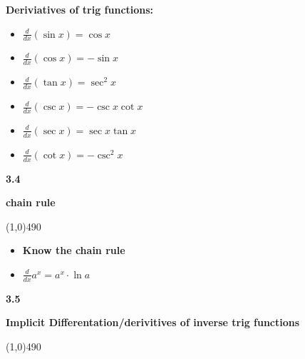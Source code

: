 \documentclass{report}
\begin{document}
    \bigbreak \noindent 
    \begin{mdframed}
        \textbf{Deriviatives of trig functions:}
          \begin{itemize}
            \item $ \frac{d}{dx}( \sin{x}) = \cos{x}$
            \item $ \frac{d}{dx}( \cos{x}) = - \sin{x}$
            \item $ \frac{d}{dx}( \tan{x}) = \sec^2{x}$
            \item $ \frac{d}{dx}( \csc{x}) =-\csc{x}\cot{x}$
            \item $ \frac{d}{dx}( \sec{x}) =\sec{x}\tan{x}$
            \item $ \frac{d}{dx}( \cot{x}) =-\csc^2{x}$
          \end{itemize}
    \end{mdframed}

    \bigbreak \noindent 
    \begin{Large}
        \begin{mdframed}
            \begin{center}
                \textbf{3.4}
            \end{center}
        \end{mdframed}
    \end{Large}
    \begin{Large}
        \begin{center}
            \textbf{chain rule}
        \end{center}
    \end{Large}
    \line(1,0){490}
    
    \bigbreak \noindent 
    \begin{mdframed}
        \begin{itemize}
           \item \textbf{Know the chain rule}
           \item $\frac{d}{dx}a^{x} = a^{x}\cdot \ln{a}$ 
        \end{itemize}
    \end{mdframed}

    \bigbreak \noindent 
    \begin{Large}
        \begin{mdframed}
            \begin{center}
                \textbf{3.5}
            \end{center}
        \end{mdframed}
    \end{Large}
    \begin{Large}
        \begin{center}
            \textbf{Implicit Differentation/derivitives of inverse trig functions}
        \end{center}
    \end{Large}
    \line(1,0){490}
    
\end{document}
